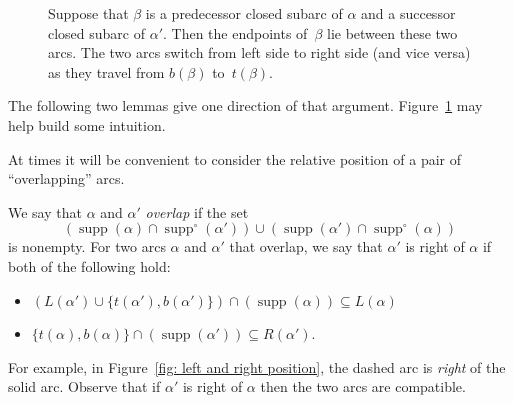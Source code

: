 \documentclass[ALCO,ThmDefs,Unicode,epreuves]{cedram}
\DeclareMathOperator{\supp}{supp}
\newcommand{\suppo}{\supp^{\circ}}
\renewcommand{\1}{\hat{1}}
\newcommand{\0}{\hat{0}}
\newcommand{\newword}[1]{\emph{#1}}
\begin{document}
\begin{figure}[htb]

\caption{Suppose that $\beta$ is a predecessor closed subarc of $\alpha$ and a successor closed subarc of $\alpha'$.
Then the endpoints of~$\beta$ lie between these two arcs.
The two arcs switch from left side to right side (and vice versa) as they travel from $b(\beta)$ to~$t(\beta)$. }
\label{fig: subarc}
\end{figure}

The following two lemmas give one direction of that argument.
Figure~\ref{fig: subarc} may help build some intuition.

At times it will be convenient to consider the relative position of a pair of ``overlapping'' arcs.

We say that $\alpha$ and $\alpha'$ \newword{overlap} if the set $$\left(\supp(\alpha)\cap\suppo(\alpha')\right)\cup \left(\supp(\alpha')\cap \suppo(\alpha)\right)$$ is nonempty.
For two arcs $\alpha$ and $\alpha'$ that overlap, we say that $\alpha'$ is right of $\alpha$ if both of the following hold:
\begin{itemize}
\item $\left(L(\alpha') \cup \{t(\alpha'),b(\alpha')\}\right) \cap \left(\supp(\alpha) \right)\subseteq L(\alpha)$
\item $\{t(\alpha), b(\alpha)\} \cap \left(\supp(\alpha')\right) \subseteq R(\alpha')$.
\end{itemize}
For example, in Figure~\ref{fig: left and right position}, the dashed arc is \emph{right} of the solid arc.
Observe that if $\alpha'$ is right of $\alpha$ then the two arcs are compatible.
\end{document}

